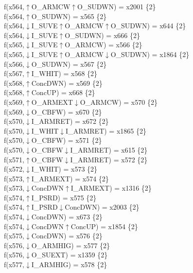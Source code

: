 f(x564,$\uparrow$O\_ARMCW$\uparrow$O\_SUDWN) = x2001 \{2\} \\  
f(x564,$\uparrow$O\_SUDWN) = x565 \{2\} \\  
f(x564,$\downarrow$I\_SUVE$\uparrow$O\_ARMCW$\uparrow$O\_SUDWN) = x644 \{2\} \\  
f(x564,$\downarrow$I\_SUVE$\uparrow$O\_SUDWN) = x666 \{2\} \\  
f(x565,$\downarrow$I\_SUVE$\uparrow$O\_ARMCW) = x566 \{2\} \\  
f(x565,$\downarrow$I\_SUVE$\uparrow$O\_ARMCW$\downarrow$O\_SUDWN) = x1864 \{2\} \\  
f(x566,$\downarrow$O\_SUDWN) = x567 \{2\} \\  
f(x567,$\uparrow$I\_WHIT) = x568 \{2\} \\  
f(x568,$\uparrow$ConcDWN) = x569 \{2\} \\  
f(x568,$\uparrow$ConcUP) = x668 \{2\} \\  
f(x569,$\uparrow$O\_ARMEXT$\downarrow$O\_ARMCW) = x570 \{2\} \\  
f(x569,$\downarrow$O\_CBFW) = x670 \{2\} \\  
f(x570,$\downarrow$I\_ARMRET) = x672 \{2\} \\  
f(x570,$\downarrow$I\_WHIT$\downarrow$I\_ARMRET) = x1865 \{2\} \\  
f(x570,$\downarrow$O\_CBFW) = x571 \{2\} \\  
f(x570,$\downarrow$O\_CBFW$\downarrow$I\_ARMRET) = x615 \{2\} \\  
f(x571,$\uparrow$O\_CBFW$\downarrow$I\_ARMRET) = x572 \{2\} \\  
f(x572,$\downarrow$I\_WHIT) = x573 \{2\} \\  
f(x573,$\uparrow$I\_ARMEXT) = x574 \{2\} \\  
f(x573,$\downarrow$ConcDWN$\uparrow$I\_ARMEXT) = x1316 \{2\} \\  
f(x574,$\uparrow$I\_PSRD) = x575 \{2\} \\  
f(x574,$\uparrow$I\_PSRD$\downarrow$ConcDWN) = x2003 \{2\} \\  
f(x574,$\downarrow$ConcDWN) = x673 \{2\} \\  
f(x574,$\downarrow$ConcDWN$\uparrow$ConcUP) = x1854 \{2\} \\  
f(x575,$\downarrow$ConcDWN) = x576 \{2\} \\  
f(x576,$\downarrow$O\_ARMHIG) = x577 \{2\} \\  
f(x576,$\downarrow$O\_SUEXT) = x1359 \{2\} \\  
f(x577,$\downarrow$I\_ARMHIG) = x578 \{2\} \\  

